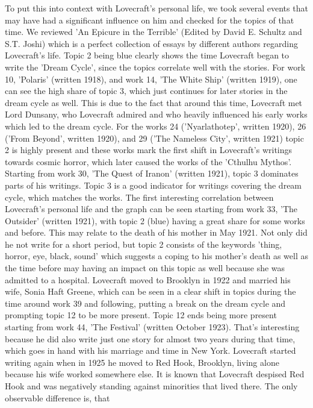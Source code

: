 To put this into context with Lovecraft's personal life, we took several events that may have had 
a significant influence on him and checked for the topics of that time. We reviewed 'An Epicure in 
the Terrible' (Edited by David E. Schultz and S.T. Joshi) which is a perfect collection of essays 
by different authors regarding Lovecraft's life. Topic 2 being blue clearly shows the time Lovecraft 
began to write the 'Dream Cycle', since the topics correlate well with the stories. For work 10, 
'Polaris' (written 1918), and work 14, 'The White Ship' (written 1919), one can see the high share 
of topic 3, which just continues for later stories in the dream cycle as well. This is due to the 
fact that around this time, Lovecraft met Lord Dunsany, who Lovecraft admired and who heavily 
influenced his early works which led to the dream cycle. For the works 24 ('Nyarlathotep', 
written 1920), 26 ('From Beyond', written 1920), and 29 ('The Nameless City', written 1921) 
topic 2 is highly present and these works mark the first shift in Lovecraft's writings towards 
cosmic horror, which later caused the works of the 'Cthulhu Mythos'. Starting from work 30, 'The 
Quest of Iranon' (written 1921), topic 3 dominates parts of his writings. Topic 3 is a good indicator 
for writings covering the dream cycle, which matches the works. The first interesting correlation 
between Lovecraft's personal life and the graph can be seen starting from work 33, 'The Outsider' 
(written 1921), with topic 2 (blue) having a great share for some works and before. This may relate 
to the death of his mother in May 1921. Not only did he not write for a short period, but topic 2 
consists of the keywords 'thing, horror, eye, black, sound' which suggests a coping to his mother's 
death as well as the time before may having an impact on this topic as well because she was admitted 
to a hospital. Lovecraft moved to Brooklyn in 1922 and married his wife, Sonia Haft Greene, which 
can be seen in a clear shift in topics during the time around work 39 and following, putting a break 
on the dream cycle and prompting topic 12 to be more present. Topic 12 ends being more present starting 
from work 44, 'The Festival' (written October 1923). That's interesting because he did also write just 
one story for almost two years during that time, which goes in hand with his marriage and time in New 
York. Lovecraft started writing again when in 1925 he moved to Red Hook, Brooklyn, living alone 
because his wife worked somewhere else. It is known that Lovecraft despised Red Hook and was 
negatively standing against minorities that lived there. The only observable difference is, that 
